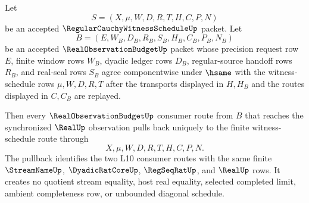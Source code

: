 \begin{theorem}
\label{thm:regular-cauchy-witness-schedule-budget-pullback-exactness}
Let
$$
S=(X,\mu,W,D,R,T,H,C,P,N)
$$
be an accepted $\RegularCauchyWitnessScheduleUp$ packet. Let
$$
B=(E,W_B,D_B,R_B,S_B,H_B,C_B,P_B,N_B)
$$
be an accepted $\RealObservationBudgetUp$ packet whose precision request row $E$, finite window rows $W_B$, dyadic ledger rows $D_B$, regular-source handoff rows $R_B$, and real-seal rows $S_B$ agree componentwise under $\hsame$ with the witness-schedule rows $\mu,W,D,R,T$ after the transports displayed in $H,H_B$ and the routes displayed in $C,C_B$ are replayed.

Then every $\RealObservationBudgetUp$ consumer route from $B$ that reaches the synchronized $\RealUp$ observation pulls back uniquely to the finite witness-schedule route through
$$
X,\mu,W,D,R,T,H,C,P,N.
$$
The pullback identifies the two L10 consumer routes with the same finite $\StreamNameUp$, $\DyadicRatCoreUp$, $\RegSeqRatUp$, and $\RealUp$ rows. It creates no quotient stream equality, host real equality, selected completed limit, ambient completeness row, or unbounded diagonal schedule.
\end{theorem}
